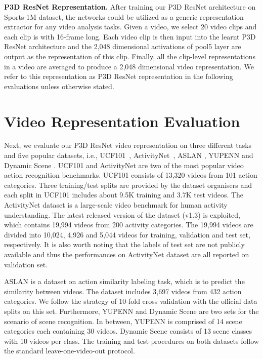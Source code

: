 \documentclass[10pt,twocolumn,letterpaper]{article}
\begin{document}
\textbf{P3D ResNet Representation.} After training our P3D ResNet architecture on Sports-1M dataset, the networks could be utilized as a generic representation extractor for any video analysis tasks. Given a video, we select 20 video clips and each clip is with 16-frame long. Each video clip is then input into the learnt P3D ResNet architecture and the 2,048 dimensional activations of pool5 layer are output as the representation of this clip. Finally, all the clip-level representations in a video are averaged to produce a 2,048 dimensional video representation. We refer to this representation as P3D ResNet representation in the following evaluations unless otherwise stated.



\section{Video Representation Evaluation}
Next, we evaluate our P3D ResNet video representation on three different tasks and five popular datasets, i.e., UCF101~\cite{UCF101}, ActivityNet~\cite{caba2015activitynet}, ASLAN \cite{KG:PAMI12}, YUPENN \cite{Der:CVPR12} and Dynamic Scene \cite{Shroff:CVPR10}. UCF101 and ActivityNet are two of the most popular video action recognition benchmarks. UCF101 consists of 13,320 videos from 101 action categories. Three training/test splits are provided by the dataset organisers and each split in UCF101 includes about 9.5K training and 3.7K test videos. The ActivityNet dataset is a large-scale video benchmark for human activity understanding. The latest released version of the dataset (v1.3) is exploited, which contains 19,994 videos from 200 activity categories. The 19,994 videos are divided into 10,024, 4,926 and 5,044 videos for training, validation and test set, respectively. It is also worth noting that the labels of test set are not publicly available and thus the performances on ActivityNet dataset are all reported on validation set.

ASLAN is a dataset on action similarity labeling task, which is to predict the similarity between videos. The dataset includes 3,697 videos from 432 action categories. We follow the strategy of 10-fold cross validation with the official data splits on this set. Furthermore, YUPENN and Dynamic Scene are two sets for the scenario of scene recognition. In between, YUPENN is comprised of 14 scene categories each containing 30 videos. Dynamic Scene consists of 13 scene classes with 10 videos per class. The training and test procedures on both datasets follow the standard leave-one-video-out protocol.
\end{document}
